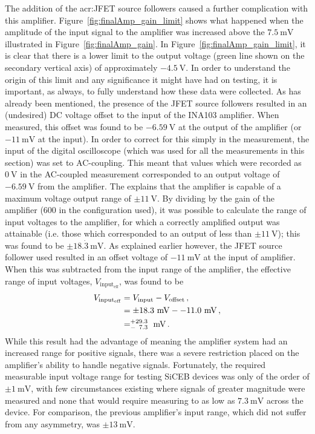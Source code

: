 The addition of the \gls{acr:JFET} source followers caused a further complication with this amplifier. Figure~\ref{fig:finalAmp_gain_limit} shows what happened when the amplitude of the input signal to the amplifier was increased above the $7.5~\mathrm{mV}$ illustrated in Figure~\ref{fig:finalAmp_gain}. In Figure~\ref{fig:finalAmp_gain_limit}, it is clear that there is a lower limit to the output voltage (green line shown on the secondary vertical axis) of approximately $-4.5~\mathrm{V}$. In order to understand the origin of this limit and any significance it might have had on testing, it is important, as always, to fully understand how these data were collected. As has already been mentioned, the presence of the JFET source followers resulted in an (undesired) DC voltage offset to the input of the INA103 amplifier. When measured, this offset was found to be $-6.59~\mathrm{V}$ at the output of the amplifier (or $-11~\mathrm{mV}$ at the input). In order to correct for this simply in the measurement, the input of the digital oscilloscope (which was used for all the measurements in this section) was set to AC-coupling. This meant that values which were recorded as $0~\mathrm{V}$ in the AC-coupled measurement corresponded to an output voltage of $-6.59~\mathrm{V}$ from the amplifier. The \textcite{INA103DS} explains that the amplifier is capable of a maximum voltage output range of $\pm 11~\mathrm{V}$. By dividing by the gain of the amplifier ($600$ in the configuration used), it was possible to calculate the range of input voltages to the amplifier, for which a correctly amplified output was attainable (i.e. those which corresponded to an output of less than $\pm 11~\mathrm{V}$); this was found to be $\pm 18.\dot{3}~\mathrm{mV}$. As explained earlier however, the JFET source follower used resulted in an offset voltage of $-11~\mathrm{mV}$ at the input of amplifier. When this was subtracted from the input range of the amplifier, the effective range of input voltages, $V_{\mathrm{input_{eff}}}$, was found to be
\begin{align}
V_{\mathrm{input_{eff}}} &= V_{\mathrm{input}} - V_{\mathrm{offset}}\, , \label{eqn:amp_input_range}\\
&= \pm 18.3~\mathrm{mV} - -11.0~\mathrm{mV}\, , \\  
&= ^{+29.3}_{-\hphantom{2} 7.3}~\mathrm{mV} \, . \label{res:finalAmp_input_range}
\end{align}
While this result had the advantage of meaning the amplifier system had an increased range for positive signals, there was a severe restriction placed on the amplifier's ability to handle negative signals. Fortunately, the required measurable input voltage range for testing SiCEB devices was only of the order of $\pm 1~\mathrm{mV}$, with few circumstances existing where signals of greater magnitude were measured and none that would require measuring to as low as $7.3~\mathrm{mV}$ across the device. For comparison, the previous amplifier's input range, which did not suffer from any asymmetry, was $\pm 13~\mathrm{mV}$.
